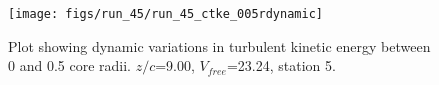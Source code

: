 \begin{figure}[H]
\centering
\texttt{[image: figs/run\_45/run\_45\_ctke\_005rdynamic]}
\caption{Plot showing dynamic variations in turbulent kinetic energy between 0 and 0.5 core radii. $z/c$=9.00, $V_{free}$=23.24, station 5.}
\label{fig:run_45_ctke_005rdynamic}
\end{figure}


